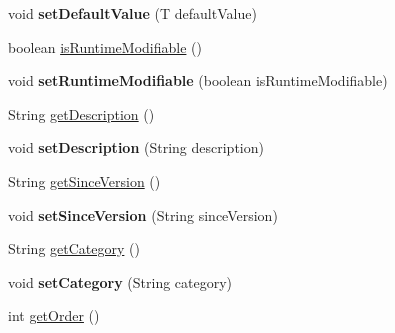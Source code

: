 \begin{DoxyCompactItemize}
void {\bfseries set\+Default\+Value} (T default\+Value)
\item 
boolean \mbox{\hyperlink{classcom_1_1mysql_1_1cj_1_1conf_1_1_abstract_property_definition_a6c98140b2db84ccd0ff29ce165ec9ef5}{is\+Runtime\+Modifiable}} ()
\item 
\mbox{\label{classcom_1_1mysql_1_1cj_1_1conf_1_1_abstract_property_definition_a1ae576395ef360eea939a702b045d353}} 
void {\bfseries set\+Runtime\+Modifiable} (boolean is\+Runtime\+Modifiable)
\item 
String \mbox{\hyperlink{classcom_1_1mysql_1_1cj_1_1conf_1_1_abstract_property_definition_af4a34d8afb26e311ff0f2290d9189bb5}{get\+Description}} ()
\item 
\mbox{\label{classcom_1_1mysql_1_1cj_1_1conf_1_1_abstract_property_definition_a4b9d84be3fb1eac5d42707c405397eb9}} 
void {\bfseries set\+Description} (String description)
\item 
String \mbox{\hyperlink{classcom_1_1mysql_1_1cj_1_1conf_1_1_abstract_property_definition_a7f8ad00dc040a63ca6ec46ebda863a1d}{get\+Since\+Version}} ()
\item 
\mbox{\label{classcom_1_1mysql_1_1cj_1_1conf_1_1_abstract_property_definition_a14aedd7c097260f02b59a8f6cbec5d01}} 
void {\bfseries set\+Since\+Version} (String since\+Version)
\item 
String \mbox{\hyperlink{classcom_1_1mysql_1_1cj_1_1conf_1_1_abstract_property_definition_a42152845862ecc58cab2f76ff8359e5c}{get\+Category}} ()
\item 
\mbox{\label{classcom_1_1mysql_1_1cj_1_1conf_1_1_abstract_property_definition_ae03fd77dd1ceb3cab75d1306509d277f}} 
void {\bfseries set\+Category} (String category)
\item 
int \mbox{\hyperlink{classcom_1_1mysql_1_1cj_1_1conf_1_1_abstract_property_definition_ace6e9092bf122ffc61f14b1893cb2d22}{get\+Order}} ()
\item 
\mbox{\label{classcom_1_1mysql_1_1cj_1_1conf_1_1_abstract_property_definition_ad98ad4ff5fbf672f211c9437a6d13e51}} 

\end{DoxyCompactItemize}
